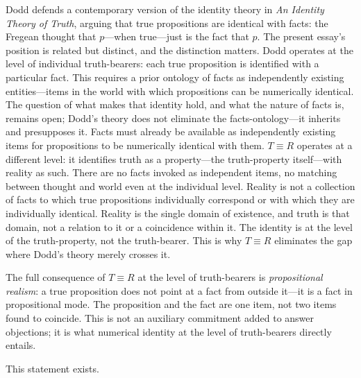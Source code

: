 \documentclass[11pt, oneside]{article}
\newcommand{\sep}{%
    \begin{center}\vspace{2pt}%
    \textcolor{LogosGray}{\textemdash\textemdash\textemdash}%
    \vspace{2pt}\end{center}%
}
\begin{document}
Dodd defends a contemporary version of the identity theory in
\textit{An Identity Theory of Truth}, arguing that true propositions
are identical with facts: the Fregean thought that $p$---when
true---just is the fact that $p$. The present essay's position is
related but distinct, and the distinction matters. Dodd operates at the
level of individual truth-bearers: each true proposition is identified
with a particular fact. This requires a prior ontology of facts as
independently existing entities---items in the world with which
propositions can be numerically identical. The question of what makes
that identity hold, and what the nature of facts is, remains open;
Dodd's theory does not eliminate the facts-ontology---it inherits and
presupposes it. Facts must already be available as independently existing
items for propositions to be numerically identical with them. $T \equiv R$
operates at a different level: it identifies truth as a
property---the truth-property itself---with reality as such. There are
no facts invoked as independent items, no matching between thought and
world even at the individual level. Reality is not a collection of facts
to which true propositions individually correspond or with which they are
individually identical. Reality is the single domain of existence, and
truth is that domain, not a relation to it or a coincidence within it.
The identity is at the level of the truth-property, not the
truth-bearer. This is why $T \equiv R$ eliminates the gap where Dodd's
theory merely crosses it.

The full consequence of $T \equiv R$ at the level of truth-bearers is
\textit{propositional realism}: a true proposition does not point at a
fact from outside it---it is a fact in propositional mode. The
proposition and the fact are one item, not two items found to coincide.
This is not an auxiliary commitment added to answer objections; it is
what numerical identity at the level of truth-bearers directly entails.

\sep

This statement exists.
\end{document}
